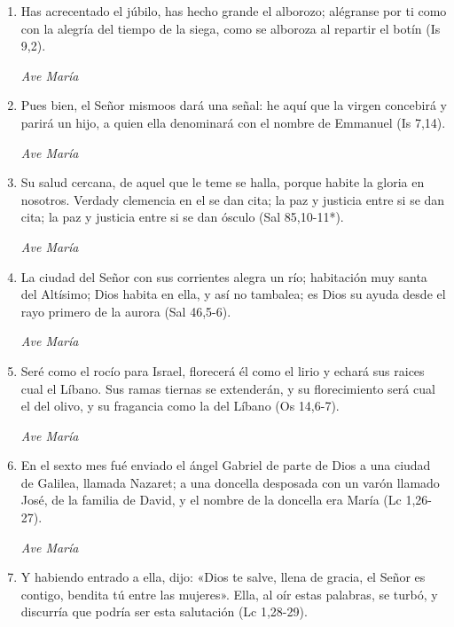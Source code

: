 \documentclass[a4paper,11pt, oneside]{report}
\begin{document}
        \begin{enumerate}
          \item Has acrecentado el júbilo, has hecho grande el alborozo; alégranse por ti como con la alegría del tiempo de la siega, 
          como se alboroza al repartir el botín (Is 9,2).

          \textit{Ave María}

          \item Pues bien, el Señor mismoos dará una señal: he aquí que la virgen concebirá y parirá un hijo, a quien ella denominará con el nombre de Emmanuel (Is 7,14).

          \textit{Ave María}

          \item Su salud cercana, de aquel que le teme se halla, porque habite la gloria en nosotros. Verdady clemencia en el se dan cita;
          la paz y justicia entre si se dan cita; la paz y justicia entre si se dan ósculo (Sal 85,10-11*).

          \textit{Ave María}

          \item La ciudad del Señor con sus corrientes alegra un río; habitación muy santa del Altísimo; Dios habita en ella, y así no tambalea; es Dios
          su ayuda desde el rayo primero de la aurora (Sal 46,5-6).

          \textit{Ave María}

          \item Seré como el rocío para Israel, florecerá él como el lirio y echará sus raices cual el Líbano. Sus ramas tiernas se extenderán,
          y su florecimiento será cual el del olivo, y su fragancia como la del Líbano (Os 14,6-7).

          \textit{Ave María}

          \item En el sexto mes fué enviado el ángel Gabriel de parte de Dios a una ciudad de Galilea, llamada Nazaret; a una doncella desposada con un varón
          llamado José, de la familia de David, y el nombre de la doncella era María (Lc 1,26-27).

          \textit{Ave María}

          \item Y habiendo entrado a ella, dijo: «Dios te salve, llena de gracia, el Señor es contigo, bendita tú entre las mujeres». Ella, al oír estas
          palabras, se turbó, y discurría que podría ser esta salutación (Lc 1,28-29).
          

\end{enumerate}
\end{document}
